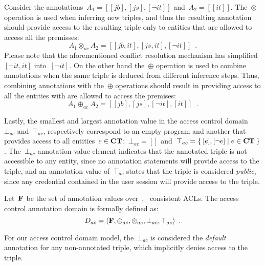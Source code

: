 \begin{example}
  Consider the annotations~$A_{1} = [[jb],[js],[\neg it]]$ and~$A_{2} = [[it]]$.  
  The~$\otimes$ operation is used when inferring new triples, and thus the resulting annotation should provide access to
  the resulting triple only to entities that are allowed to access all the premisses:
  $$A_{1} \otimes_{ac} A_{2} = [[jb,it],[js,it], [\neg it]] \enspace . $$
  Please note that the aforementioned conflict resolution mechanism has simplified~$[\neg it,it]$ into~$[\neg it]$.
  On the other hand the~$\oplus$ operation is used to combine annotations when the same triple is deduced from different
  inference steps.  Thus, combining annotations with the~$\oplus$ operations should result in providing access to all
  the entities with are allowed to access the premises:
  \[
  A_{1} \oplus_{ac} A_{2} = [[jb],[js],[\neg it],[it]] \enspace . 
  \]
\end{example}
%
Lastly, the smallest and largest annotation value in the access control domain~$\bot_{ac}$ and~$\top_{ac}$, respectively
correspond to an empty \nrdn program and another that provides access to all entities~$e\in\mathbf{CT}$:~$\bot_{ac} = []$
and~$\top_{ac} = \left\{\: [e], [\neg e] \mid e \in \mathbf{CT} \:\right\}$.
%
The~$\bot_{ac}$ annotation value element indicates that the annotated triple is not accessible to any entity, since no
annotation statements will provide access to the triple, and an annotation value of~$\top_{ac}$ states that the triple
is considered \emph{public}, since any credential contained in the user session will provide access to the triple.
%
\begin{definition}
  Let~$\mathbf{F}$ be the set of annotation values over~\ACT, \ie~consistent \acp{ACL}. The access control annotation
  domain is formally defined as:
  $$D_{ac} = \langle \mathbf{F}, \oplus_{ac}, \otimes_{ac}, \bot_{ac}, \top_{ac} \rangle \enspace .$$
\end{definition}
%
For our access control domain model, the~$\bot_{ac}$ is considered the \emph{default} annotation for any non-annotated
triple, which implicitly denies access to the triple.



